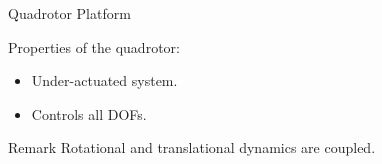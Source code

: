 \documentclass{thesisbeamer}
\begin{document}
\begin{frame}[t]{Quadrotor Platform} \vspace{4pt}


Properties of the quadrotor:

\begin{itemize}
	\item Under-actuated system.
	\item Controls all DOFs.
\end{itemize}

\vspace{2cm}

	\begin{block}{Remark}
	\vspace{0.5em}
	Rotational and translational dynamics are coupled.
	\vspace{0.5em}
	\end{block}


\end{frame}
\end{document}
